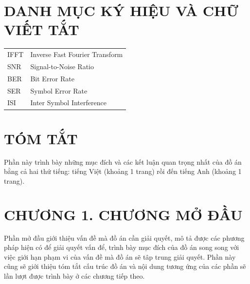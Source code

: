 \documentclass{article} %
\begin{document}
\section*{\centering DANH MỤC KÝ HIỆU VÀ CHỮ VIẾT TẮT}
 {}
\begin{table}[H]
\centering
\begin{tabularx}{0.8\textwidth} { 
  >{\Raggedleft\arraybackslash}X 
  >{\Raggedleft\arraybackslash}X[2]}
 
IFFT& Inverse Fast Fourier Transform\\

SNR & Signal-to-Noise Ratio  \\
BER & Bit Error Rate\\
SER & Symbol Error Rate \\
ISI & Inter Symbol Interference \\
\end{tabularx}
\end{table}
\cleardoublepage

\listoffigures
{} {}
\cleardoublepage

\listoftables
{} {}
\cleardoublepage

\section*{\centering TÓM TẮT}
 {}
Phần này trình bày những mục đích và các kết luận quan trọng nhất của đồ án bằng cả hai thứ tiếng: tiếng Việt (khoảng 1 trang) rồi đến tiếng Anh (khoảng 1 trang).
\cleardoublepage

\section*{\centering  CHƯƠNG 1. CHƯƠNG MỞ ĐẦU}
\setcounter{section}{1}
 {}
Phần mở đầu giới thiệu vấn đề mà đồ án cần giải quyết, mô tả được các phương pháp hiện có để giải quyết vấn để, trình bày mục đích của đồ án song song với việc giới hạn phạm vi của vấn đề mà đồ án sẽ tâp trung giải quyết. Phần này cũng sẽ giới thiệu tóm tắt cấu trúc đồ án và nội dung tương ứng của các phần sẽ lần lượt được trình bày ở các chương tiếp theo.
\end{document}
